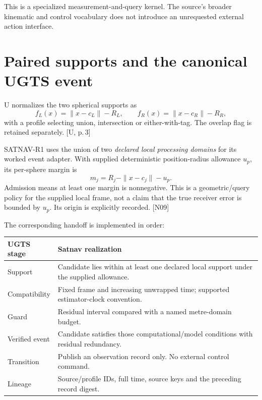 \documentclass[11pt,a4paper]{article}
\newcommand{\src}[1]{\textcolor{muted}{[U, #1]}}
\newcommand{\dec}[1]{\textcolor{accent}{[N#1]}}
\begin{document}
This is a specialized measurement-and-query kernel. The source's broader kinematic
and control vocabulary does not introduce an unrequested external action interface.
\clearpage

\section{Paired supports and the canonical UGTS event}
U normalizes the two spherical supports as
\begin{equation}
f_L(x)=\|x-c_L\|-R_L,\qquad f_R(x)=\|x-c_R\|-R_R,
\end{equation}
with a profile selecting union, intersection or either-with-tag. The overlap flag
is retained separately. \src{p.\,3}

SATNAV-R1 uses the union of two \emph{declared local processing domains} for its
worked event adapter. With supplied deterministic position-radius allowance $u_p$,
its per-sphere margin is
\begin{equation}
m_j=R_j-\|x-c_j\|-u_p.
\end{equation}
Admission means at least one margin is nonnegative. This is a geometric/query policy
for the supplied local frame, not a claim that the true receiver error is bounded by
$u_p$. Its origin is explicitly recorded. \dec{09}

The corresponding handoff is implemented in order:
\begin{center}
\begin{tabularx}{\textwidth}{@{}P{.24\textwidth}Y@{}}\toprule
\textbf{UGTS stage} & \textbf{Satnav realization}\\\midrule
Support & Candidate lies within at least one declared local support under the supplied allowance.\\
Compatibility & Fixed frame and increasing unwrapped time; supported estimator-clock convention.\\
Guard & Residual interval compared with a named metre-domain budget.\\
Verified event & Candidate satisfies those computational/model conditions with residual redundancy.\\
Transition & Publish an observation record only. No external control command.\\
Lineage & Source/profile IDs, full time, source keys and the preceding record digest.\\\bottomrule
\end{tabularx}
\end{center}
\end{document}
